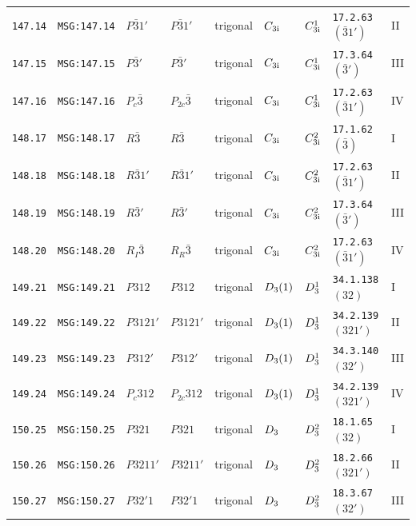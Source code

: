 \documentclass[fleqn,10pt]{jsarticle}
\begin{document}
\begin{center}
\begin{longtable}{lllllllll}
\texttt{147.14} & \texttt{MSG:147.14} & $P\bar{3}1'$ & $P\bar{3}1'$ & trigonal & $C_{\rm 3i}$ & $C_{\rm 3i}^{1}$ & \texttt{17.2.63} $(\bar{3}1')$ & II \\
\texttt{147.15} & \texttt{MSG:147.15} & $P\bar{3}'$ & $P\bar{3}'$ & trigonal & $C_{\rm 3i}$ & $C_{\rm 3i}^{1}$ & \texttt{17.3.64} $(\bar{3}')$ & III \\
\texttt{147.16} & \texttt{MSG:147.16} & $P_{c}\bar{3}$ & $P_{2c}\bar{3}$ & trigonal & $C_{\rm 3i}$ & $C_{\rm 3i}^{1}$ & \texttt{17.2.63} $(\bar{3}1')$ & IV \\ \hline
\texttt{148.17} & \texttt{MSG:148.17} & $R\bar{3}$ & $R\bar{3}$ & trigonal & $C_{\rm 3i}$ & $C_{\rm 3i}^{2}$ & \texttt{17.1.62} $(\bar{3})$ & I \\
\texttt{148.18} & \texttt{MSG:148.18} & $R\bar{3}1'$ & $R\bar{3}1'$ & trigonal & $C_{\rm 3i}$ & $C_{\rm 3i}^{2}$ & \texttt{17.2.63} $(\bar{3}1')$ & II \\
\texttt{148.19} & \texttt{MSG:148.19} & $R\bar{3}'$ & $R\bar{3}'$ & trigonal & $C_{\rm 3i}$ & $C_{\rm 3i}^{2}$ & \texttt{17.3.64} $(\bar{3}')$ & III \\
\texttt{148.20} & \texttt{MSG:148.20} & $R_{I}\bar{3}$ & $R_{R}\bar{3}$ & trigonal & $C_{\rm 3i}$ & $C_{\rm 3i}^{2}$ & \texttt{17.2.63} $(\bar{3}1')$ & IV \\ \hline
\texttt{149.21} & \texttt{MSG:149.21} & $P312$ & $P312$ & trigonal & $D_{\rm 3}(1)$ & $D_{\rm 3}^{1}$ & \texttt{34.1.138} $(32)$ & I \\
\texttt{149.22} & \texttt{MSG:149.22} & $P3121'$ & $P3121'$ & trigonal & $D_{\rm 3}(1)$ & $D_{\rm 3}^{1}$ & \texttt{34.2.139} $(321')$ & II \\
\texttt{149.23} & \texttt{MSG:149.23} & $P312'$ & $P312'$ & trigonal & $D_{\rm 3}(1)$ & $D_{\rm 3}^{1}$ & \texttt{34.3.140} $(32')$ & III \\
\texttt{149.24} & \texttt{MSG:149.24} & $P_{c}312$ & $P_{2c}312$ & trigonal & $D_{\rm 3}(1)$ & $D_{\rm 3}^{1}$ & \texttt{34.2.139} $(321')$ & IV \\ \hline
\texttt{150.25} & \texttt{MSG:150.25} & $P321$ & $P321$ & trigonal & $D_{\rm 3}$ & $D_{\rm 3}^{2}$ & \texttt{18.1.65} $(32)$ & I \\
\texttt{150.26} & \texttt{MSG:150.26} & $P3211'$ & $P3211'$ & trigonal & $D_{\rm 3}$ & $D_{\rm 3}^{2}$ & \texttt{18.2.66} $(321')$ & II \\
\texttt{150.27} & \texttt{MSG:150.27} & $P32'1$ & $P32'1$ & trigonal & $D_{\rm 3}$ & $D_{\rm 3}^{2}$ & \texttt{18.3.67} $(32')$ & III \\

\end{longtable}
\end{center}
\end{document}
